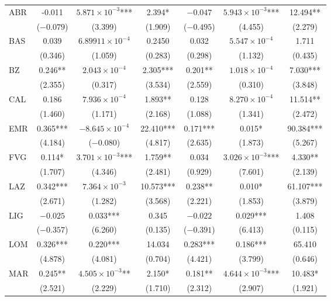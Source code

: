 \documentclass[12pt]{article}
\begin{document}
\begin{appendices}
\begin{longtable}{@{}lcccccc@{}}
            ABR & -0.011 & $5.871 \times 10^{-3}$*** & 2.394* & $-0.047$ & $5.943 \times 10^{-3}$*** & 12.494** \\ 
             & ($-0.079$) & (3.399) & (1.909) & ($-0.495$) & (4.455) & (2.279) \\ 
            BAS & 0.039 & $6.89911 \times 10^{-4}$ & 0.2450 & 0.032 & $5.547 \times 10^{-4}$ & 1.711 \\ 
             & (0.346) & (1.059) & (0.283) & (0.298) & (1.132) & (0.435) \\ 
            BZ & 0.246** & $2.043 \times 10^{-4}$ & 2.305*** & 0.201** & $1.018 \times 10^{-4}$ & 7.030*** \\ 
             & (2.355) & (0.317) & (3.534) & (2.559) & (0.310) & (3.848) \\ 
            CAL & 0.186 & $7.936 \times 10^{-4}$ & 1.893** & 0.128 & $8.270 \times 10^{-4}$ & 11.514** \\ 
             & (1.460) & (1.171) & (2.168) & (1.088) & (1.341) & (2.472) \\ 
            EMR & 0.365*** & $-8.645 \times 10^{-4}$ & 22.410*** & 0.171*** & 0.015* & 90.384*** \\ 
             & (4.184) & ($-0.080$) & (4.817) & (2.635) & (1.873) & (5.267) \\ 
            FVG & 0.114* & $3.701 \times 10^{-3}$*** & 1.759** & 0.034 & $3.026 \times 10^{-3}$*** & 4.330** \\ 
             & (1.707) & (4.346) & (2.481) & (0.929) & (7.601) & (2.139) \\ 
            LAZ & 0.342*** & $7.364 \times 10^{-3}$ & 10.573*** & 0.238** & 0.010* & 61.107*** \\ 
             & (2.671) & (1.282) & (3.568) & (2.221) & (1.853) & (3.879) \\ 
            LIG & $-0.025$ & 0.033*** & 0.345 & $-0.022$ & 0.029*** & 1.408 \\ 
             & ($-0.357$) & (6.260) & (0.135) & ($-0.391$) & (6.413) & (0.115) \\ 
            LOM & 0.326*** & 0.220*** & 14.034 & 0.283*** & 0.186*** & 65.410 \\ 
             & (4.878) & (4.081) & (0.704) & (4.421) & (3.799) & (0.646) \\ 
            MAR & 0.245** & $4.505 \times 10^{-3}$** & 2.150* & 0.181** & $4.644 \times 10^{-3}$*** & 10.483* \\ 
             & (2.521) & (2.229) & (1.710) & (2.312) & (2.907) & (1.921) \\ 

\end{longtable}
\end{appendices}
\end{document}
